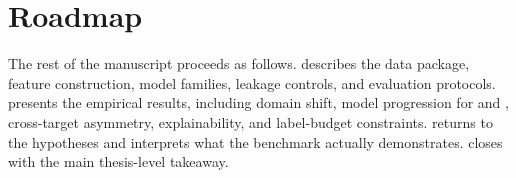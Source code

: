 \section{Roadmap}

The rest of the manuscript proceeds as follows.  describes the data package, feature construction, model families, leakage controls, and evaluation protocols.  presents the empirical results, including domain shift, model progression for \fpos{} and \fmiss{}, cross-target asymmetry, explainability, and label-budget constraints.  returns to the hypotheses and interprets what the benchmark actually demonstrates.  closes with the main thesis-level takeaway.
